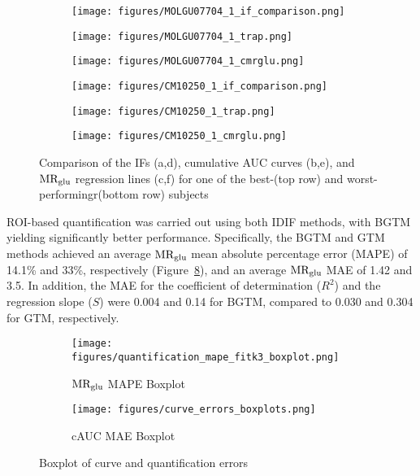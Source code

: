\begin{figure}[h]
	\centering
	\begin{subfigure}[b]{0.322\textwidth}
		\texttt{[image: figures/MOLGU07704\_1\_if\_comparison.png]}
		\caption{}
		\label{subfig:good_if_compare}
	\end{subfigure}
	\begin{subfigure}[b]{0.322\textwidth}
		\texttt{[image: figures/MOLGU07704\_1\_trap.png]}
		\caption{}
		\label{subfig:good_trap_compare}
	\end{subfigure}
	\begin{subfigure}[b]{0.322\textwidth}
		\texttt{[image: figures/MOLGU07704\_1\_cmrglu.png]}
		\caption{}
		\label{fig:good_cmrglu}
	\end{subfigure}
	\begin{subfigure}[b]{0.322\textwidth}
		\texttt{[image: figures/CM10250\_1\_if\_comparison.png]}
		\caption{}
		\label{subfig:bad_if_compare}
	\end{subfigure}
	\begin{subfigure}[b]{0.322\textwidth}
		\texttt{[image: figures/CM10250\_1\_trap.png]}
		\caption{}
		\label{subfig:bad_trap_compare}
	\end{subfigure}
	\begin{subfigure}[b]{0.322\textwidth}
		\texttt{[image: figures/CM10250\_1\_cmrglu.png]}
		\caption{}
		\label{fig:bad_cmrglu}
	\end{subfigure}
	\caption{Comparison of the IFs (a,d), cumulative AUC curves (b,e), and $\text{MR}_{\text{glu}}$ regression lines (c,f) for one of the best-(top row) and worst-performingr(bottom row) subjects}
	\label{fig:ifs}
\end{figure}

ROI-based quantification was carried out using both IDIF methods, with BGTM yielding significantly better performance.
Specifically, the BGTM and GTM methods achieved an average \(\text{MR}_{\text{glu}}\) mean absolute percentage error (MAPE) of 14.1\% and 33\%, respectively (Figure~\ref{subfig:mape_boxplot}), and an average \(\text{MR}_{\text{glu}}\) MAE of 1.42 and 3.5.
In addition, the MAE for the coefficient of determination (\(R^2\)) and the regression slope (\(S\)) were 0.004 and 0.14 for BGTM, compared to 0.030 and 0.304 for GTM, respectively.

\begin{figure}
	\centering
	\begin{subfigure}[b]{0.45\textwidth}
		\texttt{[image: figures/quantification\_mape\_fitk3\_boxplot.png]}
		\caption{\(\text{MR}_{\text{glu}}\) MAPE Boxplot}
		\label{subfig:mape_boxplot}
	\end{subfigure}
	\begin{subfigure}[b]{0.45\textwidth}
		\texttt{[image: figures/curve\_errors\_boxplots.png]}
		\caption{cAUC MAE Boxplot}
		\label{subfig:cauc_boxplot}
	\end{subfigure}
	\caption{Boxplot of curve and quantification errors}
	\label{fig:boxplots}
\end{figure}

